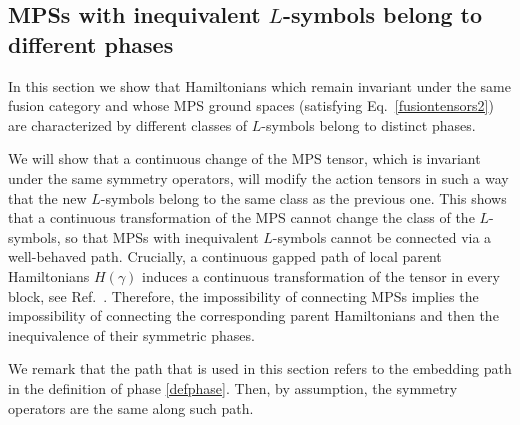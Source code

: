 \documentclass[a4paper,twocolumn,11pt,accepted=2023-02-10]{quantumarticle}
\begin{document}
\subsection{MPSs with inequivalent $L$-symbols belong to different phases}
%

In this section we show that Hamiltonians which remain invariant under the same fusion category and whose MPS ground spaces (satisfying Eq.\ \eqref{fusiontensors2}) are characterized by different classes of $L$-symbols belong to distinct phases. 

We will show that a continuous change of the MPS tensor, which is invariant under the same symmetry operators, will modify the action tensors in such a way that the new $L$-symbols belong to the same class as the previous one. This shows that a continuous transformation of the MPS cannot change the class of the $L$-symbols, so that MPSs with inequivalent $L$-symbols cannot be connected via a well-behaved path. Crucially, a continuous gapped path of local parent Hamiltonians $H(\gamma)$ induces a continuous transformation of the tensor in every block, see Ref.\ \cite{Schuch11}. Therefore, the impossibility of connecting MPSs implies the impossibility of connecting the corresponding parent Hamiltonians and then the inequivalence of their symmetric phases.

We remark that the path that is used in this section refers to the embedding path in the definition of phase \ref{defphase}. Then, by assumption, the symmetry operators are the same along such path.
\end{document}
